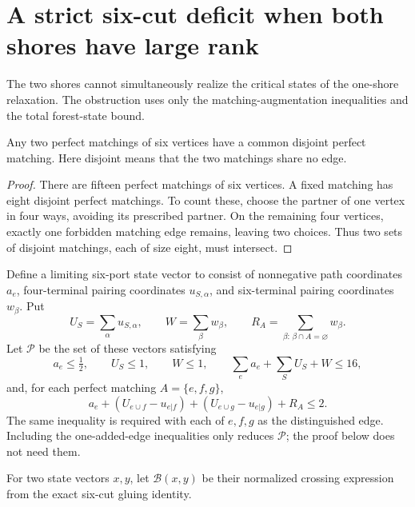 \section{A strict six-cut deficit when both shores have large rank}
\label{sec:four-six-large-shores}

The two shores cannot simultaneously realize the critical states of the one-shore relaxation.
The obstruction uses only the matching-augmentation inequalities and the total forest-state bound.

\begin{lemma}
\label{lem:four-six-common-matching}
Any two perfect matchings of six vertices have a common disjoint perfect matching.
Here disjoint means that the two matchings share no edge.
\end{lemma}

\begin{proof}
There are fifteen perfect matchings of six vertices.
A fixed matching has eight disjoint perfect matchings.
To count these, choose the partner of one vertex in four ways, avoiding its prescribed partner.
On the remaining four vertices, exactly one forbidden matching edge remains, leaving two choices.
Thus two sets of disjoint matchings, each of size eight, must intersect.
\end{proof}

Define a limiting six-port state vector to consist of nonnegative path coordinates $a_e$, four-terminal pairing coordinates $u_{S,\alpha}$, and six-terminal pairing coordinates $w_\beta$.
Put
\[
 U_S=\sum_\alpha u_{S,\alpha},\qquad W=\sum_\beta w_\beta,
 \qquad R_A=\sum_{\beta:\,\beta\cap A=\varnothing}w_\beta.
\]
Let $\mathcal P$ be the set of these vectors satisfying
\[
 a_e\le\tfrac12,\qquad U_S\le1,\qquad W\le1,
 \qquad \sum_ea_e+\sum_SU_S+W\le16,
\]
and, for each perfect matching $A=\{e,f,g\}$,
\begin{equation}\label{eq:four-six-limit-augmentation}
 a_e+(U_{e\cup f}-u_{e|f})
     +(U_{e\cup g}-u_{e|g})+R_A\le2.
\end{equation}
The same inequality is required with each of $e,f,g$ as the distinguished edge.
Including the one-added-edge inequalities only reduces $\mathcal P$; the proof below does not need them.

For two state vectors $x,y$, let $\mathcal B(x,y)$ be their normalized crossing expression from the exact six-cut gluing identity.

